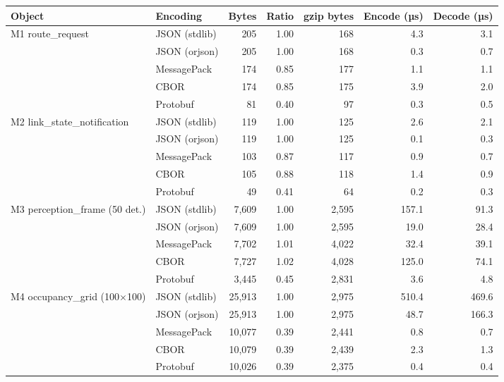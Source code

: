 \begin{tabular}{llrrrrr}
\toprule
\rowcolor{blue!6}\textbf{Object} & \textbf{Encoding} & \textbf{Bytes} & \textbf{Ratio} & \textbf{gzip bytes} & \textbf{Encode (µs)} & \textbf{Decode (µs)} \\
\midrule
M1 route\_request & JSON (stdlib) & 205 & 1.00 & 168 & 4.3 & 3.1 \\
 & JSON (orjson) & 205 & 1.00 & 168 & 0.3 & 0.7 \\
 & MessagePack & 174 & 0.85 & 177 & 1.1 & 1.1 \\
 & CBOR & 174 & 0.85 & 175 & 3.9 & 2.0 \\
 & Protobuf & 81 & 0.40 & 97 & 0.3 & 0.5 \\
\midrule
M2 link\_state\_notification & JSON (stdlib) & 119 & 1.00 & 125 & 2.6 & 2.1 \\
 & JSON (orjson) & 119 & 1.00 & 125 & 0.1 & 0.3 \\
 & MessagePack & 103 & 0.87 & 117 & 0.9 & 0.7 \\
 & CBOR & 105 & 0.88 & 118 & 1.4 & 0.9 \\
 & Protobuf & 49 & 0.41 & 64 & 0.2 & 0.3 \\
\midrule
M3 perception\_frame (50 det.) & JSON (stdlib) & 7,609 & 1.00 & 2,595 & 157.1 & 91.3 \\
 & JSON (orjson) & 7,609 & 1.00 & 2,595 & 19.0 & 28.4 \\
 & MessagePack & 7,702 & 1.01 & 4,022 & 32.4 & 39.1 \\
 & CBOR & 7,727 & 1.02 & 4,028 & 125.0 & 74.1 \\
 & Protobuf & 3,445 & 0.45 & 2,831 & 3.6 & 4.8 \\
\midrule
M4 occupancy\_grid (100$\times$100) & JSON (stdlib) & 25,913 & 1.00 & 2,975 & 510.4 & 469.6 \\
 & JSON (orjson) & 25,913 & 1.00 & 2,975 & 48.7 & 166.3 \\
 & MessagePack & 10,077 & 0.39 & 2,441 & 0.8 & 0.7 \\
 & CBOR & 10,079 & 0.39 & 2,439 & 2.3 & 1.3 \\
 & Protobuf & 10,026 & 0.39 & 2,375 & 0.4 & 0.4 \\
\bottomrule
\end{tabular}
